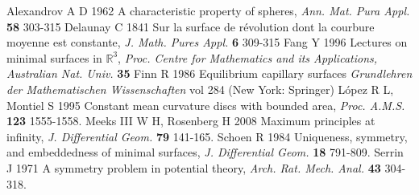 \documentclass[12pt,a4paper]{amsart}
\begin{document}
\begin{thebibliography}{00}
 Alexandrov A D 1962
A characteristic property of spheres, \emph{Ann. Mat. Pura Appl.} \textbf{58} 303-315
 Delaunay C 1841
Sur la surface de r\'evolution dont la courbure moyenne est constante,
\emph{J. Math. Pures Appl.} {\bf 6} 309-315
 Fang Y 1996
Lectures on minimal surfaces in ${\mathbb R}^3$,
\emph{Proc. Centre for Mathematics and its
Applications, Australian Nat. Univ.} {\bf 35}
 Finn R 1986 Equilibrium capillary surfaces {\it Grundlehren der Mathematischen Wissenschaften} vol 284 (New York: Springer)
 L\'opez R L, Montiel S 1995
Constant mean curvature discs with bounded area,
\emph{ Proc. A.M.S.} \textbf{123 } 1555-1558.
 Meeks III W H, Rosenberg H 2008
Maximum principles at infinity,
\emph{J. Differential Geom.} \textbf{79 } 141-165.
 Schoen R 1984 Uniqueness, symmetry, and embeddedness of minimal surfaces, \emph{J. Differential Geom.} \textbf{18} 791-809.
 Serrin J 1971 A symmetry problem in potential theory,\emph{ Arch. Rat. Mech. Anal.} \textbf{43} 304-318.
\end{thebibliography}
\end{document}
